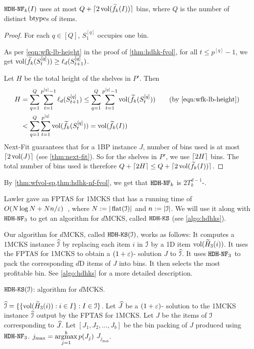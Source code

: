 \begin{theorem}
\label{thm:hdhk-nf-fvol}
$\hdhknf(I)$ uses at most $Q + \smallceil{2\vol(\wfk(I))}$ bins,
where $Q$ is the number of distinct $\btype$s of items.
\end{theorem}
\begin{proof}
For each $q \in [Q]$, $S_1^{[q]}$ occupies one bin.

As per \cref{eqn:wfk-lb-height} in the proof of \cref{thm:hdhk-fvol},
for all $t \le p^{[q]}-1$, we get $\vol(\wfk(S_t^{[q]}))
\ge \ell_d(S_{t+1}^{[q]})$.

Let $H$ be the total height of the shelves in $P'$. Then
\begin{align*}
H &= \sum_{q=1}^Q \sum_{t=1}^{p^{[q]}-1} \ell_d(S_{t+1}^{[q]})
\le \sum_{q=1}^Q \sum_{t=1}^{p^{[q]}-1} \vol(\wfk(S_t^{[q]}))  \tag{by \eqref{eqn:wfk-lb-height}}
\\ &< \sum_{q=1}^Q \sum_{t=1}^{p^{[q]}} \vol(\wfk(S_t^{[q]}))
= \vol(\wfk(I))
\end{align*}
Next-Fit guarantees that for a 1BP instance $J$,
number of bins used is at most $\ceil{2\vol(J)}$ (see \cref{thm:next-fit}).
So for the shelves in $P'$, we use $\ceil{2H}$ bins.
The total number of bins used is therefore
$Q + \ceil{2H} \le Q + \smallceil{2\vol(\wfk(I))}$.
\end{proof}

By \cref{thm:wfvol-sp,thm:hdhk-nf-fvol}, we get that $\hdhknf$ is $2T_k^{d-1}$-\asymAppx{}.

Lawler gave an FPTAS for 1MCKS that has a running time of
$O(N\log N + Nn/\eps)$~\cite{lawler1979fast},
where $N \defeq |\flatten(\Ical)|$ and $n \defeq |\Ical|$.
We will use it along with $\hdhknf[3]$ to get an algorithm for $d$MCKS,
called $\hdhks$ (see \cref{algo:hdhks}).

Our algorithm for $d$MCKS, called $\hdhks(\Ical)$, works as follows:
It computes a 1MCKS instance $\Icalhat$ by replacing each item $i$ in $\Ical$
by a 1D item $\vol(\wHk[3](i))$.
It uses the FPTAS for 1MCKS to obtain a $(1+\eps)$-\appx{} solution $J$ to $\Icalhat$.
It uses $\hdhknf[3]$ to pack the corresponding $d$D items of $J$ into bins.
It then selects the most profitable bin.
See \cref{algo:hdhks} for a more detailed description.

\begin{algorithm}[!ht]
\caption{$\hdhks(\Ical)$: algorithm for $d$MCKS.}
\label{algo:hdhks}
\begin{algorithmic}[1]
\State $\Icalhat = \{\{\vol(\wHk[3](i)): i \in I\}: I \in \Ical\}$.
\State Let $\Jhat$ be a $(1+\eps)$-\appx{} solution to the 1MCKS instance $\Icalhat$
    output by the FPTAS for 1MCKS.
\State Let $J$ be the items of $\Ical$ corresponding to $\Jhat$.
\State Let $[J_1, J_2, \ldots, J_b]$ be the bin packing of $J$ produced using $\hdhknf[3]$.
\State ${\displaystyle j_{\max} = \argmax_{j=1}^b p(J_j)}$
\State \Return $J_{j_{\max}}$.
\end{algorithmic}
\end{algorithm}

